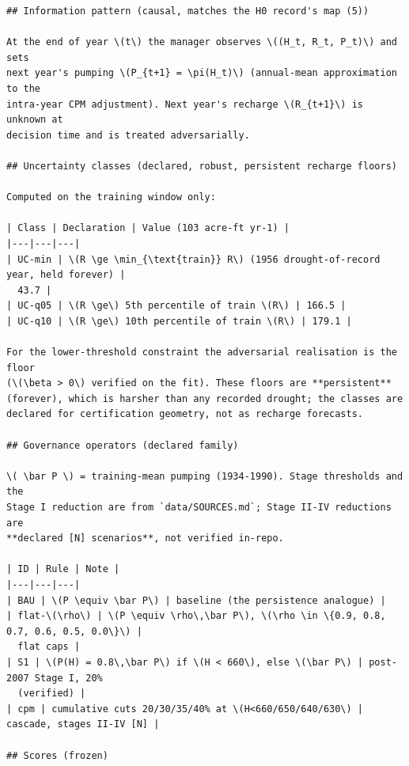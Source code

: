 \documentclass[11pt,a4paper]{article}
\begin{document}
\begin{footnotesize}
\begin{verbatim}
## Information pattern (causal, matches the H0 record's map (5))

At the end of year \(t\) the manager observes \((H_t, R_t, P_t)\) and sets
next year's pumping \(P_{t+1} = \pi(H_t)\) (annual-mean approximation to the
intra-year CPM adjustment). Next year's recharge \(R_{t+1}\) is unknown at
decision time and is treated adversarially.

## Uncertainty classes (declared, robust, persistent recharge floors)

Computed on the training window only:

| Class | Declaration | Value (103 acre-ft yr-1) |
|---|---|---|
| UC-min | \(R \ge \min_{\text{train}} R\) (1956 drought-of-record year, held forever) |
  43.7 |
| UC-q05 | \(R \ge\) 5th percentile of train \(R\) | 166.5 |
| UC-q10 | \(R \ge\) 10th percentile of train \(R\) | 179.1 |

For the lower-threshold constraint the adversarial realisation is the floor
(\(\beta > 0\) verified on the fit). These floors are **persistent**
(forever), which is harsher than any recorded drought; the classes are
declared for certification geometry, not as recharge forecasts.

## Governance operators (declared family)

\( \bar P \) = training-mean pumping (1934-1990). Stage thresholds and the
Stage I reduction are from `data/SOURCES.md`; Stage II-IV reductions are
**declared [N] scenarios**, not verified in-repo.

| ID | Rule | Note |
|---|---|---|
| BAU | \(P \equiv \bar P\) | baseline (the persistence analogue) |
| flat-\(\rho\) | \(P \equiv \rho\,\bar P\), \(\rho \in \{0.9, 0.8, 0.7, 0.6, 0.5, 0.0\}\) |
  flat caps |
| S1 | \(P(H) = 0.8\,\bar P\) if \(H < 660\), else \(\bar P\) | post-2007 Stage I, 20%
  (verified) |
| cpm | cumulative cuts 20/30/35/40% at \(H<660/650/640/630\) | cascade, stages II-IV [N] |

## Scores (frozen)


\end{verbatim}
\end{footnotesize}
\end{document}
